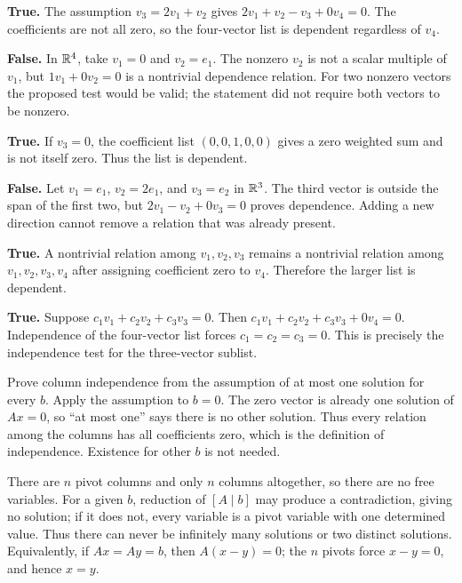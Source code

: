 \textbf{True.} The assumption $v_3=2v_1+v_2$ gives
$2v_1+v_2-v_3+0v_4=0$. The coefficients are not all zero,
so the four-vector list is dependent regardless of $v_4$.

\textbf{False.} In $\mathbb{R}^4$, take $v_1=0$ and $v_2=e_1$.
The nonzero $v_2$ is not a scalar multiple of $v_1$, but
$1v_1+0v_2=0$ is a nontrivial dependence relation.
For two nonzero vectors the proposed test would be valid; the statement
did not require both vectors to be nonzero.

\textbf{True.} If $v_3=0$, the coefficient list $(0,0,1,0,0)$
gives a zero weighted sum and is not itself zero. Thus the list is dependent.

\textbf{False.} Let $v_1=e_1$, $v_2=2e_1$, and $v_3=e_2$ in $\mathbb{R}^3$.
The third vector is outside the span of the first two, but
$2v_1-v_2+0v_3=0$ proves dependence. Adding a new direction cannot
remove a relation that was already present.

\textbf{True.} A nontrivial relation among $v_1,v_2,v_3$ remains
a nontrivial relation among $v_1,v_2,v_3,v_4$ after assigning coefficient
zero to $v_4$. Therefore the larger list is dependent.

\textbf{True.} Suppose $c_1v_1+c_2v_2+c_3v_3=0$.
Then $c_1v_1+c_2v_2+c_3v_3+0v_4=0$. Independence of the
four-vector list forces $c_1=c_2=c_3=0$. This is precisely the
independence test for the three-vector sublist.

\goal Prove column independence from the assumption of at most one
solution for every $b$.
Apply the assumption to $b=0$. The zero vector is already one
solution of $Ax=0$, so ``at most one'' says there is no other solution.
Thus every relation among the columns has all coefficients zero,
which is the definition of independence. Existence for other $b$ is not needed.

There are $n$ pivot columns and only $n$ columns altogether, so
there are no free variables. For a given $b$, reduction of $[A\mid b]$
may produce a contradiction, giving no solution; if it does not, every
variable is a pivot variable with one determined value. Thus there
can never be infinitely many solutions or two distinct solutions.
Equivalently, if $Ax=Ay=b$, then $A(x-y)=0$; the $n$ pivots force
$x-y=0$, and hence $x=y$.


